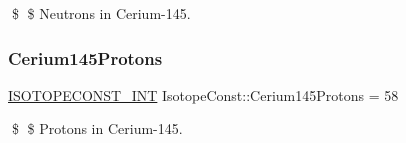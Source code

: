 \$ \$ Neutrons in Cerium-\/145. \mbox{\label{group___isotope_const-_cerium-_ce145_gabecba4dc32f1306d7803630530c39cba}} 
\subsubsection{\texorpdfstring{Cerium145\+Protons}{Cerium145Protons}}
{\footnotesize\ttfamily \mbox{\hyperlink{group___isotope_const-_macros_ga5f18360b3e99483a35c32d789e62621c}{I\+S\+O\+T\+O\+P\+E\+C\+O\+N\+S\+T\+\_\+\+I\+NT}} Isotope\+Const\+::\+Cerium145\+Protons = 58}

\$ \$ Protons in Cerium-\/145. 
